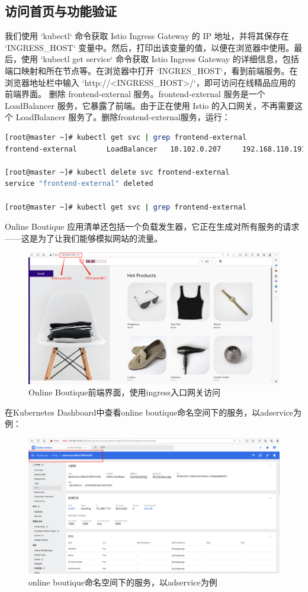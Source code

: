 \subsection{访问首页与功能验证}
我们使用 `kubectl` 命令获取 Istio Ingress Gateway 的 IP 地址，并将其保存在 `INGRESS\_HOST` 变量中。然后，打印出该变量的值，以便在浏览器中使用。最后，使用 `kubectl get service` 命令获取 Istio Ingress Gateway 的详细信息，包括端口映射和所在节点等。在浏览器中打开 `INGRES\_HOST`，看到前端服务。在浏览器地址栏中输入 `http://<INGRESS\_HOST>/`，即可访问在线精品应用的前端界面。
删除 frontend-external 服务。frontend-external 服务是一个 LoadBalancer 服务，它暴露了前端。由于正在使用 Istio 的入口网关，不再需要这个 LoadBalancer 服务了。删除frontend-external服务，运行：
\begin{lstlisting}[language=bash]
[root@master ~]# kubectl get svc | grep frontend-external
frontend-external       LoadBalancer   10.102.0.207     192.168.110.191   80:30173/TCP   4d15h

[root@master ~]# kubectl delete svc frontend-external
service "frontend-external" deleted

[root@master ~]# kubectl get svc | grep frontend-external
\end{lstlisting}
Online Boutique 应用清单还包括一个负载发生器，它正在生成对所有服务的请求——这是为了让我们能够模拟网站的流量。
\begin{figure}[htb]
	\centering
	\includegraphics[width=1.0\textwidth]{figures/chapter2/Online Boutique.png}
	\caption{Online Boutique前端界面，使用ingress入口网关访问}
	\label{fig:2-Online Boutique前端界面}
\end{figure}
在Kubernetes Dashboard中查看online boutique命名空间下的服务，以adservice为例：
\begin{figure}[htb]
	\centering
	\includegraphics[width=1.0\textwidth]{figures/chapter2/online boutique on dashboard.png}
	\caption{online boutique命名空间下的服务，以adservice为例}
	\label{fig:2-online boutique命名空间下的服务，以adservice为例}
\end{figure}
